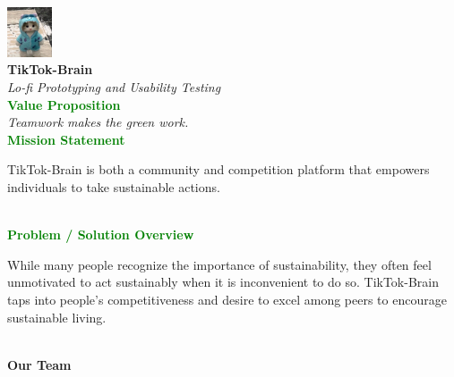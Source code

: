 \documentclass{article}
\begin{document}
\begin{titlepage}
\begin{center}

    \includegraphics[width=0.1\textwidth]{./resources/logo.png} \\
    \vspace{0.5cm}
    {\Huge \textbf{TikTok-Brain}} \\[0.5cm]
    {\LARGE \textit{Lo-fi Prototyping and Usability Testing}} \\[2cm]

    \textbf{\textcolor{green}{\Large Value Proposition}} \\[0.3cm]
    \textit{\large Teamwork makes the green work.} \\[1cm]

    \textbf{\textcolor{green}{\Large Mission Statement}} \\[0.3cm]
    \parbox{0.8\textwidth}{
        \centering
        \large
        TikTok-Brain is both a community and competition platform that empowers individuals to take sustainable actions.
    } \\[1cm]

    \textbf{\textcolor{green}{\Large Problem / Solution Overview}} \\[0.3cm]
    \parbox{0.8\textwidth}{
        \centering
        \large
        While many people recognize the importance of sustainability, they often feel unmotivated to act sustainably when it is inconvenient to do so. TikTok-Brain taps into people’s competitiveness and desire to excel among peers to encourage sustainable living.
    } \\[1.5cm]

    \textbf{\Large Our Team} \\[0.5cm]


\end{center}
\end{titlepage}
\end{document}
